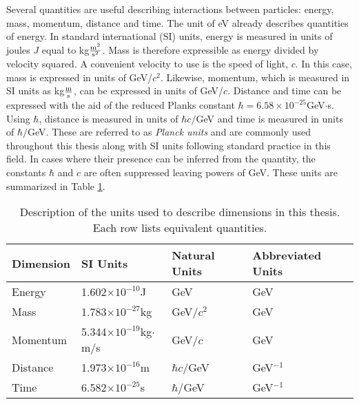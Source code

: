Several quantities are useful describing interactions between particles: energy, mass, momentum, distance and time.
The unit of eV already describes quantities of energy.
In standard international (SI) units, energy is measured in units of joules $J$ equal to kg$\frac{\text m^2}{\text s^2}$. Mass is therefore expressible as energy divided by velocity squared.
A convenient velocity to use is the speed of light, $c$.
In this case, mass is expressed in units of GeV/$c^2$.
Likewise, momentum, which is measured in SI units as kg$\frac{\text m}{\text s}$, can be expressed in units of GeV/$c$.
Distance and time can be expressed with the aid of the reduced Planks constant $\hbar=6.58\times10^{-25}$GeV$\cdot$s.
Using $\hbar$, distance is measured in units of $\hbar c/$GeV and time is measured in units of $\hbar/$GeV.
These are referred to as \emph{Planck units} and are commonly used throughout this thesis along with SI units following standard practice in this field.
In cases where their presence can be inferred from the quantity, the constants $\hbar$ and $c$ are often suppressed leaving powers of GeV.
These units are summarized in Table \ref{tab:units}.

\begin{table}[htp]
\begin{center}
\begin{tabular}{l l l l}
\toprule
Dimension & SI Units & Natural Units & Abbreviated Units \\
\midrule
Energy    &    1.602$\times10^{-10}$J               & GeV            & GeV \\
Mass      &    1.783$\times10^{-27}$kg              & GeV/$c^2$      & GeV \\
Momentum  &    5.344$\times10^{-19}$kg$\cdot$m/s    & GeV/$c$        & GeV \\
Distance  &    1.973$\times10^{-16}$m               & $\hbar c/$GeV  & GeV$^{-1}$ \\
Time      &    6.582$\times10^{-25}$s               & $\hbar/$GeV    & GeV$^{-1}$ \\
\bottomrule
\end{tabular}
\caption{Description of the units used to describe dimensions in this thesis. Each row lists equivalent quantities.}
\label{tab:units}
\end{center}
\end{table}

